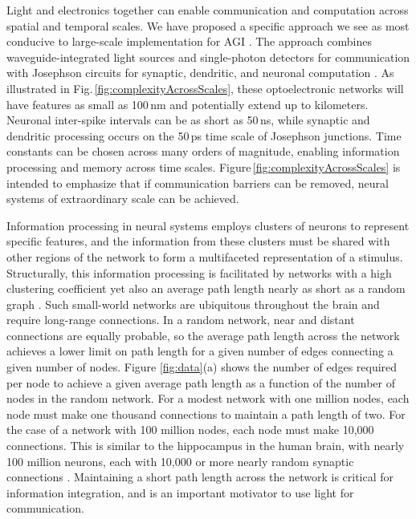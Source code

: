 \documentclass[twocolumn]{article}
\begin{document}
Light and electronics together can enable communication and computation across spatial and temporal scales. We have proposed a specific approach we see as most conducive to large-scale implementation for AGI \cite{shbu2017,sh2018,sh2018_ICRC,sh2019_fluxonic}. The approach combines waveguide-integrated light sources and single-photon detectors for communication \cite{shbu2017,buch2017} with Josephson circuits for synaptic, dendritic, and neuronal computation \cite{sh2018,sh2019_fluxonic}. As illustrated in Fig.\,\ref{fig:complexityAcrossScales}, these optoelectronic networks will have features as small as 100\,nm and potentially extend up to kilometers. Neuronal inter-spike intervals can be as short as 50\,ns, while synaptic and dendritic processing occurs on the 50\,ps time scale of Josephson junctions. Time constants can be chosen across many orders of magnitude, enabling information processing and memory across time scales. Figure\,\ref{fig:complexityAcrossScales} is intended to emphasize that if communication barriers can be removed, neural systems of extraordinary scale can be achieved.

Information processing in neural systems employs clusters of neurons to represent specific features, and the information from these clusters must be shared with other regions of the network to form a multifaceted representation of a stimulus. Structurally, this information processing is facilitated by networks with a high clustering coefficient yet also an average path length nearly as short as a random graph \cite{eskn2015}. Such small-world networks \cite{wast1998} are ubiquitous throughout the brain \cite{sp2010} and require long-range connections. In a random network, near and distant connections are equally probable, so the average path length across the network achieves a lower limit on path length for a given number of edges connecting a given number of nodes. Figure \ref{fig:data}(a) shows the number of edges required per node to achieve a given average path length as a function of the number of nodes in the random network. For a modest network with one million nodes, each node must make one thousand connections to maintain a path length of two. For the case of a network with 100 million nodes, each node must make 10,000 connections. This is similar to the hippocampus in the human brain, with nearly 100 million neurons, each with 10,000 or more nearly random synaptic connections \cite{bu2006}. Maintaining a short path length across the network is critical for information integration, and is an important motivator to use light for communication.
\end{document}
